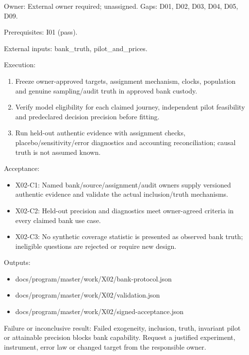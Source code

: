 \documentclass[
  11pt,
  a4paper,
]{article}
\providecommand{\tightlist}{%
  \setlength{\itemsep}{0pt}\setlength{\parskip}{0pt}}
\begin{document}
Owner: External owner required; unassigned. Gaps: D01, D02, D03, D04,
D05, D09.

Prerequisites: I01 (pass).

External inputs: bank\_truth, pilot\_and\_prices.

Execution:

\begin{enumerate}
\def\labelenumi{\arabic{enumi}.}
\tightlist
\item
  Freeze owner-approved targets, assignment mechanism, clocks,
  population and genuine sampling/audit truth in approved bank custody.
\item
  Verify model eligibility for each claimed journey, independent pilot
  feasibility and predeclared decision precision before fitting.
\item
  Run held-out authentic evidence with assignment checks,
  placebo/sensitivity/error diagnostics and accounting reconciliation;
  causal truth is not assumed known.
\end{enumerate}

Acceptance:

\begin{itemize}
\tightlist
\item
  X02-C1: Named bank/source/assignment/audit owners supply versioned
  authentic evidence and validate the actual inclusion/truth mechanisms.
\item
  X02-C2: Held-out precision and diagnostics meet owner-agreed criteria
  in every claimed bank use case.
\item
  X02-C3: No synthetic coverage statistic is presented as observed bank
  truth; ineligible questions are rejected or require new design.
\end{itemize}

Outputs:

\begin{itemize}
\tightlist
\item
  docs/program/master/work/X02/bank-protocol.json
\item
  docs/program/master/work/X02/validation.json
\item
  docs/program/master/work/X02/signed-acceptance.json
\end{itemize}

Failure or inconclusive result: Failed exogeneity, inclusion, truth,
invariant pilot or attainable precision blocks bank capability. Request
a justified experiment, instrument, error law or changed target from the
responsible owner.
\end{document}

